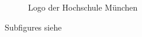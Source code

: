 \documentclass[\maintextsize, \papersize, fleqn, xcolor=dvipsnames]{scrartcl}
\begin{document}
\begin{figure}[H]
	\centering
	\begin{minipage}{0.6\textwidth}
		\centering
	\end{minipage}
	\caption{Logo der Hochschule München}
  	\label{fig:logo}
\end{figure}
	
Subfigures siehe 
	
\end{document}
